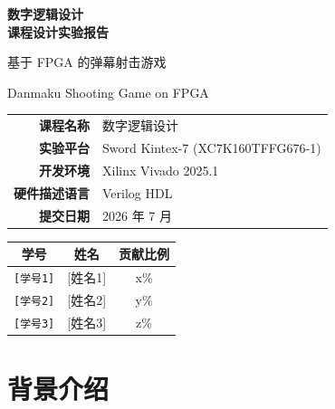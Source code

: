 \documentclass[12pt,a4paper]{ctexart}
\begin{document}
\begin{titlepage}
\centering

\vspace*{3cm}

{\Huge\bfseries 数字逻辑设计\\课程设计实验报告\\}

\vspace{1.5cm}

{\LARGE 基于 FPGA 的弹幕射击游戏\\}

\vspace{0.8cm}

{\Large Danmaku Shooting Game on FPGA\\}

\vspace{2cm}

\begin{tabular}{rl}
\toprule
\textbf{课程名称} & 数字逻辑设计 \\
\textbf{实验平台} & Sword Kintex-7 (XC7K160TFFG676-1) \\
\textbf{开发环境} & Xilinx Vivado 2025.1 \\
\textbf{硬件描述语言} & Verilog HDL \\
\textbf{提交日期} & 2026 年 7 月 \\
\bottomrule
\end{tabular}

\vspace{2cm}

\begin{tabular}{ccc}
\toprule
\textbf{学号} & \textbf{姓名} & \textbf{贡献比例} \\
\midrule
\multicolumn{1}{c}{\texttt{[学号1]}} & {[姓名1]} & x\% \\
\multicolumn{1}{c}{\texttt{[学号2]}} & {[姓名2]} & y\% \\
\multicolumn{1}{c}{\texttt{[学号3]}} & {[姓名3]} & z\% \\
\bottomrule
\end{tabular}

\vfill

\end{titlepage}

\newpage
\tableofcontents
\newpage

\section{背景介绍}
\end{document}
